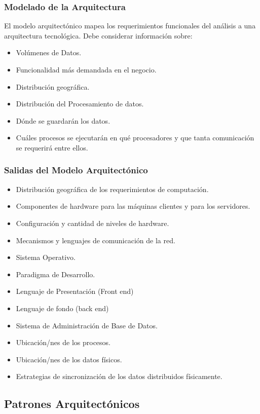 \subsubsection{Modelado de la Arquitectura}
El modelo arquitectónico mapea los requerimientos funcionales del análisis a una arquitectura tecnológica. Debe considerar información sobre:
\begin{itemize}
	\item Volúmenes de Datos.
	\item Funcionalidad más demandada en el negocio.
	\item Distribución geográfica.
	\item Distribución del Procesamiento de datos.
	\item Dónde se guardarán los datos.
	\item Cuáles procesos se ejecutarán en qué procesadores y que tanta comunicación se requerirá entre ellos.
\end{itemize}
\subsubsection{Salidas del Modelo Arquitectónico}
\begin{itemize}
	\item Distribución geográfica de los requerimientos de computación.
	\item Componentes de hardware para las máquinas clientes y para los servidores.
	\item Configuración y cantidad de niveles de hardware.
	\item Mecanismos y lenguajes de comunicación de la red.
	\item Sistema Operativo.
	\item Paradigma de Desarrollo.
	\item Lenguaje de Presentación (Front end)
	\item Lenguaje de fondo (back end)
	\item Sistema de Administración de Base de Datos.
	\item Ubicación/nes de los procesos.
	\item Ubicación/nes de los datos físicos.
	\item Estrategias de sincronización de los datos distribuidos físicamente.
\end{itemize}
\subsection{Patrones Arquitectónicos}
